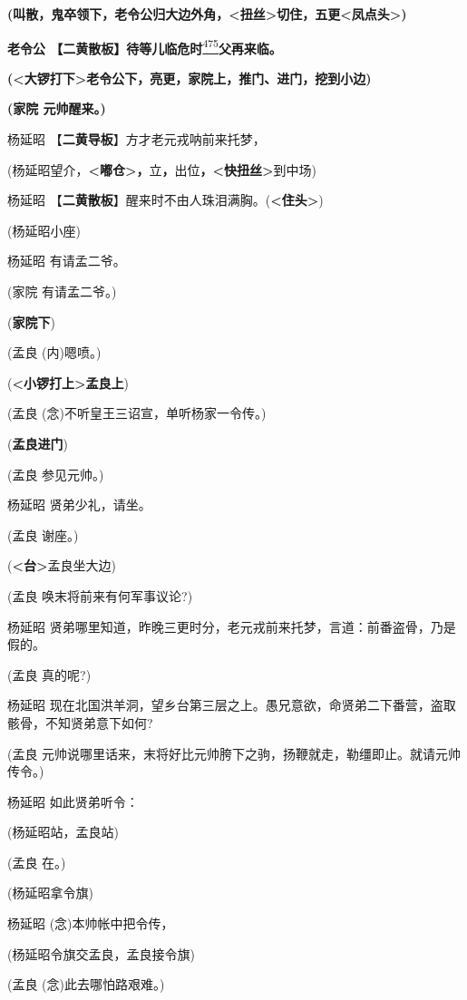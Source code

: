 \textbf{(叫散，鬼卒领下，老令公归大边外角，\textless{}扭丝\textgreater{}切住，五更\textless{}凤点头\textgreater{})}

\textbf{老令公
【二黄散板】待等儿临危时}\protect\hyperlink{fn475}{\textsuperscript{475}}\textbf{父再来临。}

\textbf{(\textless{}大锣打下\textgreater{}老令公下，亮更，家院上，推门、进门，挖到小边)}

\textbf{(家院 元帅醒来。)}

杨延昭 【\textbf{二黄导板}】方才老元戎呐前来托梦，

(杨延昭望介，\textbf{\textless{}嘟仓\textgreater{}，}立\textbf{，}出位\textbf{，\textless{}快扭丝\textgreater{}}到中场)

杨延昭
【\textbf{二黄散板}】醒来时不由人珠泪满胸。(\textbf{\textless{}住头\textgreater{}})

(杨延昭小座)

杨延昭 有请孟二爷。

(家院 有请孟二爷。)

(\textbf{家院下})

(孟良 (内)嗯喷。)

(\textbf{\textless{}小锣打上\textgreater{}孟良上})

(孟良 (念)不听皇王三诏宣，单听杨家一令传。)

(\textbf{孟良进门})

(孟良 参见元帅。)

杨延昭 贤弟少礼，请坐。

(孟良 谢座。)

(\textbf{\textless{}台\textgreater{}}孟良坐大边)

(孟良 唤末将前来有何军事议论?)

杨延昭
贤弟哪里知道，昨晚三更时分，老元戎前来托梦，言道：前番盗骨，乃是假的。

(孟良 真的呢?)

杨延昭
现在北国洪羊洞，望乡台第三层之上。愚兄意欲，命贤弟二下番营，盗取骸骨，不知贤弟意下如何?

(孟良
元帅说哪里话来，末将好比元帅胯下之驹，扬鞭就走，勒缰即止。就请元帅传令。)

杨延昭 如此贤弟听令：

(杨延昭站，孟良站)

(孟良 在。)

(杨延昭拿令旗)

杨延昭 (念)本帅帐中把令传，

(杨延昭令旗交孟良，孟良接令旗)

(孟良 (念)此去哪怕路艰难。)

